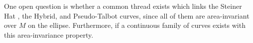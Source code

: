 One open question is whether a common thread exists which links the Steiner Hat \cite{garcia2020-deltoid}, the Hybrid, and Pseudo-Talbot curves, since all of them are area-invariant over $M$ on the ellipse. Furthermore, if a continuous family of curves exists with this area-invariance property. 
%